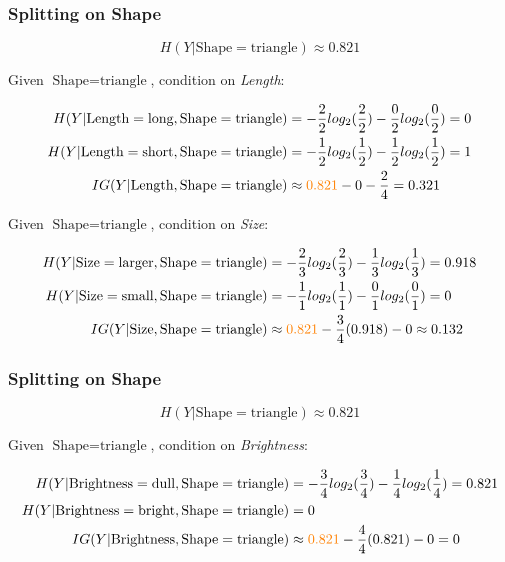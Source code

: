 \documentclass[aspectratio=169, 10pt]{beamer}
\begin{document}
\begin{frame}
    \frametitle{Splitting on Shape}
    \small
    \[ H(Y|\text{Shape}=\text{triangle}) \approx 0.821 \]

    Given $\text{Shape}=\text{triangle}$, condition on \textit{Length}:

    \[
        \begin{split}
            H(Y|\text{Length}=\text{long}, \text{Shape}=\text{triangle}) & = -\frac{2}{2} log_2(\frac{2}{2}) -\frac{0}{2} log_2(\frac{0}{2}) = 0 \\
            H(Y|\text{Length}=\text{short}, \text{Shape}=\text{triangle}) & = -\frac{1}{2} log_2(\frac{1}{2}) -\frac{1}{2} log_2(\frac{1}{2}) = 1 \\
            IG(Y|\text{Length}, \text{Shape}=\text{triangle}) & \approx \textcolor{orange}{0.821} - 0 - \frac{2}{4} = 0.321
        \end{split}
    \]

    Given $\text{Shape}=\text{triangle}$, condition on \textit{Size}:

    \[
        \begin{split}
            H(Y|\text{Size}=\text{larger}, \text{Shape}=\text{triangle}) & = -\frac{2}{3} log_2(\frac{2}{3}) -\frac{1}{3} log_2(\frac{1}{3}) = 0.918 \\
            H(Y|\text{Size}=\text{small}, \text{Shape}=\text{triangle}) & = -\frac{1}{1} log_2(\frac{1}{1}) -\frac{0}{1} log_2(\frac{0}{1}) = 0 \\
            IG(Y|\text{Size}, \text{Shape}=\text{triangle}) & \approx \textcolor{orange}{0.821} - \frac{3}{4}(0.918) - 0 \approx 0.132
        \end{split}
    \]

\end{frame}

\begin{frame}
    \frametitle{Splitting on Shape}
    \small
    \[ H(Y|\text{Shape}=\text{triangle}) \approx 0.821 \]

    Given $\text{Shape}=\text{triangle}$, condition on \textit{Brightness}:

    \[
        \begin{split}
            H(Y|\text{Brightness}=\text{dull}, \text{Shape}=\text{triangle}) & = -\frac{3}{4} log_2(\frac{3}{4}) -\frac{1}{4} log_2(\frac{1}{4}) = 0.821 \\
            H(Y|\text{Brightness}=\text{bright}, \text{Shape}=\text{triangle}) & = 0 \\
            IG(Y|\text{Brightness}, \text{Shape}=\text{triangle}) & \approx \textcolor{orange}{0.821} - \frac{4}{4}(0.821) - 0 = 0
        \end{split}
    \]
\end{frame}
\end{document}
